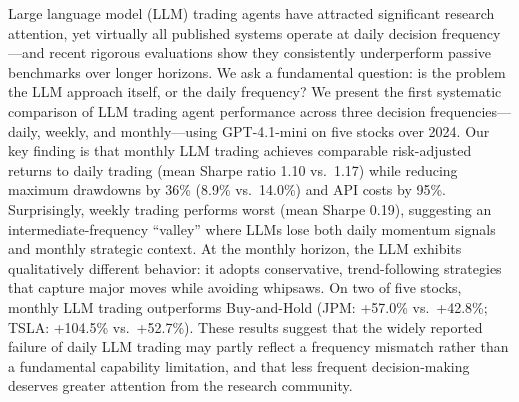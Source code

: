 Large language model (LLM) trading agents have attracted significant research attention, yet virtually all published systems operate at daily decision frequency---and recent rigorous evaluations show they consistently underperform passive benchmarks over longer horizons.
We ask a fundamental question: is the problem the LLM approach itself, or the daily frequency?
We present the first systematic comparison of LLM trading agent performance across three decision frequencies---daily, weekly, and monthly---using GPT-4.1-mini on five stocks over 2024.
Our key finding is that monthly LLM trading achieves comparable risk-adjusted returns to daily trading (mean Sharpe ratio 1.10 vs.\ 1.17) while reducing maximum drawdowns by 36\% (8.9\% vs.\ 14.0\%) and API costs by 95\%.
Surprisingly, weekly trading performs worst (mean Sharpe 0.19), suggesting an intermediate-frequency ``valley'' where LLMs lose both daily momentum signals and monthly strategic context.
At the monthly horizon, the LLM exhibits qualitatively different behavior: it adopts conservative, trend-following strategies that capture major moves while avoiding whipsaws.
On two of five stocks, monthly LLM trading outperforms Buy-and-Hold (JPM: +57.0\% vs.\ +42.8\%; TSLA: +104.5\% vs.\ +52.7\%).
These results suggest that the widely reported failure of daily LLM trading may partly reflect a frequency mismatch rather than a fundamental capability limitation, and that less frequent decision-making deserves greater attention from the research community.
